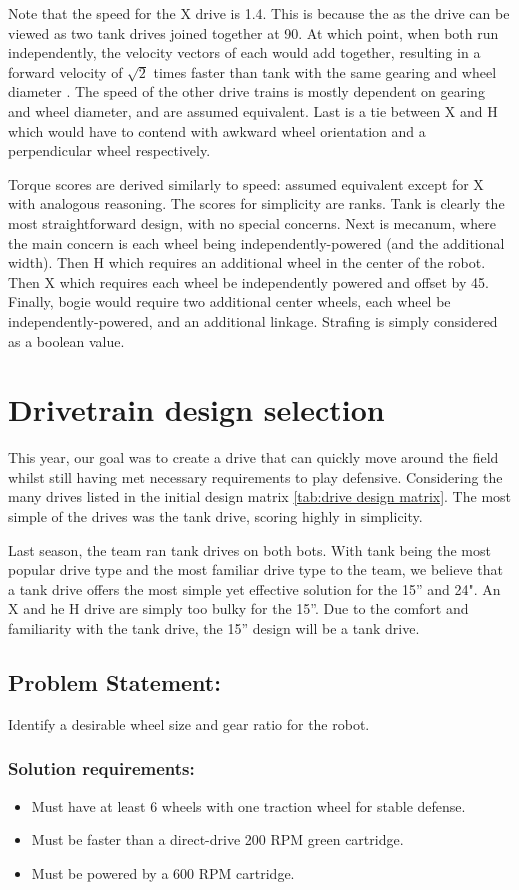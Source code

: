 Note that the speed for the X drive is 1.4. This is because the as the drive can be viewed
as two tank drives joined together at 90\degree. At which point, when both run independently,
the velocity vectors of each would add together, resulting in a forward velocity of  $\sqrt{2}$ times faster than tank with the same gearing and wheel diameter \cite{bib:drivetrainlore}. The speed of the other
drive trains is mostly dependent on gearing and wheel diameter, and are assumed equivalent.
Last is a tie between X and H which would have to contend with awkward wheel
orientation and a perpendicular wheel respectively. 


Torque scores are derived similarly to speed: assumed equivalent except for X with
analogous reasoning. The scores for simplicity are ranks. Tank is clearly the most straightforward design, with no special concerns. Next is mecanum, where the main concern is each wheel being independently-powered (and the additional width). Then H which requires an additional wheel in the center of the robot. Then X which requires each wheel be independently powered and offset by 45\degree. Finally, bogie would require two additional center wheels, each wheel be independently-powered, and an additional linkage. Strafing is simply considered as a boolean value. 



\section{Drivetrain design selection}
This year, our goal was to create a drive that can quickly move around the field whilst still
having met necessary requirements to play defensive. Considering the many drives listed in the
initial design matrix \ref{tab:drive design matrix}. The most simple of the drives was the tank drive, scoring highly in simplicity.


Last season, the team ran tank drives on both bots. With tank being the most popular drive type and
the most familiar drive type to the team, we believe that a tank drive offers the most simple
yet effective solution for the 15” and 24". An X and
he H drive are simply too bulky for the 15”. Due to the comfort and familiarity with the
tank drive, the 15” design will be a tank drive.
\subsection{Problem Statement:}
Identify a desirable wheel size and gear ratio for the robot.
\subsubsection{Solution requirements:}
\begin{itemize}
    \item Must have at least 6 wheels with one traction wheel for stable defense.
    \item Must be faster than a direct-drive 200 RPM green cartridge.
    \item Must be powered by a 600 RPM cartridge.
\end{itemize}
